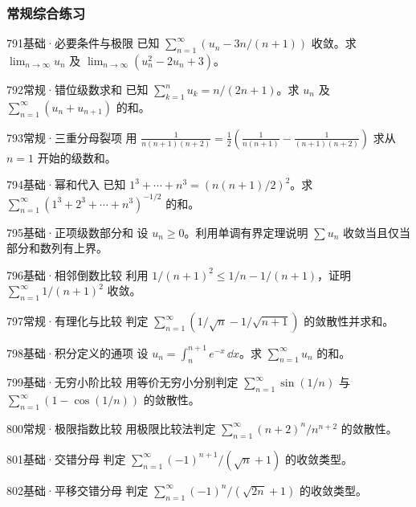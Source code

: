 \subsubsection{常规综合练习}
\begin{exercise}{791}{基础·必要条件与极限}
已知 $\sum_{n=1}^{\infty}(u_n-3n/(n+1))$ 收敛。求 $\lim_{n\to\infty}u_n$ 及 $\lim_{n\to\infty}(u_n^2-2u_n+3)$。
\end{exercise}
\begin{exercise}{792}{常规·错位级数求和}
已知 $\sum_{k=1}^nu_k=n/(2n+1)$。求 $u_n$ 及 $\sum_{n=1}^{\infty}(u_n+u_{n+1})$ 的和。
\end{exercise}
\begin{exercise}{793}{常规·三重分母裂项}
用 $\frac1{n(n+1)(n+2)}=\frac12(\frac1{n(n+1)}-\frac1{(n+1)(n+2)})$ 求从 $n=1$ 开始的级数和。
\end{exercise}
\begin{exercise}{794}{基础·幂和代入}
已知 $1^3+\cdots+n^3=(n(n+1)/2)^2$。求 $\sum_{n=1}^{\infty}(1^3+2^3+\cdots+n^3)^{-1/2}$ 的和。
\end{exercise}
\begin{exercise}{795}{基础·正项级数部分和}
设 $u_n\geq0$。利用单调有界定理说明 $\sum u_n$ 收敛当且仅当部分和数列有上界。
\end{exercise}
\begin{exercise}{796}{基础·相邻倒数比较}
利用 $1/(n+1)^2\leq1/n-1/(n+1)$，证明 $\sum_{n=1}^{\infty}1/(n+1)^2$ 收敛。
\end{exercise}
\begin{exercise}{797}{常规·有理化与比较}
判定 $\sum_{n=1}^{\infty}(1/\sqrt n-1/\sqrt{n+1})$ 的敛散性并求和。
\end{exercise}
\begin{exercise}{798}{基础·积分定义的通项}
设 $u_n=\int_n^{n+1}e^{-x}\,\dd x$。求 $\sum_{n=1}^{\infty}u_n$ 的和。
\end{exercise}
\begin{exercise}{799}{基础·无穷小阶比较}
用等价无穷小分别判定 $\sum_{n=1}^{\infty}\sin(1/n)$ 与 $\sum_{n=1}^{\infty}(1-\cos(1/n))$ 的敛散性。
\end{exercise}
\begin{exercise}{800}{常规·极限指数比较}
用极限比较法判定 $\sum_{n=1}^{\infty}(n+2)^n/n^{n+2}$ 的敛散性。
\end{exercise}
\begin{exercise}{801}{基础·交错分母}
判定 $\sum_{n=1}^{\infty}(-1)^{n+1}/(\sqrt n+1)$ 的收敛类型。
\end{exercise}
\begin{exercise}{802}{基础·平移交错分母}
判定 $\sum_{n=1}^{\infty}(-1)^n/(\sqrt{2n}+1)$ 的收敛类型。
\end{exercise}
